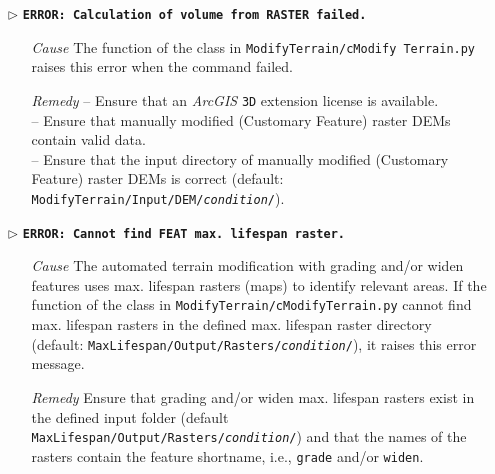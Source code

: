\begin{itemize}
	\item[$\triangleright$]\textbf{\texttt{ERROR: Calculation of volume from RASTER failed.}}
	\begin{itemize}
		\item[\textit{Cause}\hspace{0.27cm}] The  function of the  class in \texttt{ModifyTerrain/cModify Terrain.py} raises this error when the command  failed.
		\item[\textit{Remedy}] -- Ensure that an \textit{ArcGIS} \texttt{3D} extension license is available.\\
							   -- Ensure that manually modified (Customary Feature) raster DEMs contain valid data.\\
							   -- Ensure that the input directory of manually modified (Customary Feature) raster DEMs is correct (default: \texttt{ModifyTerrain/Input/DEM/\textit{condition}/}).\\
	\end{itemize}
	
	\item[$\triangleright$]\textbf{\texttt{ERROR: Cannot find FEAT max. lifespan raster.}}
	\begin{itemize}
		\item[\textit{Cause}\hspace{0.27cm}] The automated terrain modification with grading and/or widen features uses max. lifespan rasters (maps) to identify relevant areas. If the  function of the  class in \texttt{ModifyTerrain/cModifyTerrain.py} cannot find max. lifespan rasters in the defined max. lifespan raster directory (default: \texttt{MaxLifespan/Output/Rasters/\textit{condition}/}), it raises this error message.
		\item[\textit{Remedy}] Ensure that grading and/or widen max. lifespan rasters exist in the defined input folder (default \texttt{MaxLifespan/Output/Rasters/\textit{condition}/}) and that the names of the rasters contain the feature shortname, i.e., \texttt{grade} and/or \texttt{widen}.\\
	\end{itemize}
	

\end{itemize}
